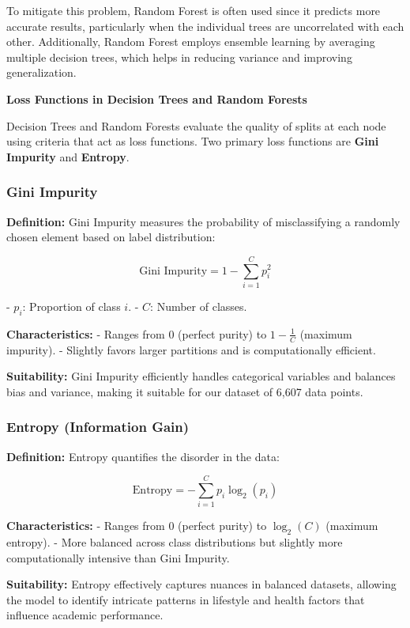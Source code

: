\documentclass[titlepage]{article}
\begin{document}
To mitigate this problem, Random Forest is often used since it predicts more accurate results, particularly when the individual trees are uncorrelated with each other. Additionally, Random Forest employs ensemble learning by averaging multiple decision trees, which helps in reducing variance and improving generalization.

\quad \textbf{Loss Functions in Decision Trees and Random Forests}

Decision Trees and Random Forests evaluate the quality of splits at each node using criteria that act as loss functions. Two primary loss functions are \textbf{Gini Impurity} and \textbf{Entropy}.

\subsubsection{Gini Impurity}

\quad \textbf{Definition:} Gini Impurity measures the probability of misclassifying a randomly chosen element based on label distribution:

\[
\text{Gini Impurity} = 1 - \sum_{i=1}^{C} p_i^2
\]

- \textbf{\( p_i \)}: Proportion of class \( i \).
- \textbf{\( C \)}: Number of classes.

\quad \textbf{Characteristics:} 
- Ranges from 0 (perfect purity) to \( 1 - \frac{1}{C} \) (maximum impurity).
- Slightly favors larger partitions and is computationally efficient.

\quad \textbf{Suitability:} Gini Impurity efficiently handles categorical variables and balances bias and variance, making it suitable for our dataset of 6,607 data points.

\subsubsection{Entropy (Information Gain)}

\quad \textbf{Definition:} Entropy quantifies the disorder in the data:

\[
\text{Entropy} = - \sum_{i=1}^{C} p_i \log_2(p_i)
\]

\quad \textbf{Characteristics:} 
- Ranges from 0 (perfect purity) to \( \log_2(C) \) (maximum entropy).
- More balanced across class distributions but slightly more computationally intensive than Gini Impurity.

\quad \textbf{Suitability:} Entropy effectively captures nuances in balanced datasets, allowing the model to identify intricate patterns in lifestyle and health factors that influence academic performance.
\end{document}
